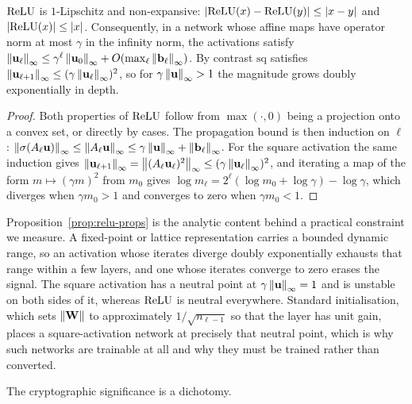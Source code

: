 \begin{proposition}
\label{prop:relu-props}
$\mathrm{ReLU}$ is $1$-Lipschitz and non-expansive: $\left\lvert \mathrm{ReLU}(x)-\mathrm{ReLU}(y) \right\rvert \le
\left\lvert x-y \right\rvert$ and $\left\lvert \mathrm{ReLU}(x) \right\rvert \le \left\lvert x \right\rvert$. Consequently, in a network whose
affine maps have operator norm at most $\gamma$ in the infinity norm, the
activations satisfy $\left\lVert \mathbf{u}_\ell \right\rVert_\infty \le \gamma^{\ell}
\left\lVert \mathbf{u}_0 \right\rVert_\infty + O(\max_\ell \left\lVert \mathbf{b}_\ell \right\rVert_\infty)$. By
contrast $\mathrm{sq}$ satisfies $\left\lVert \mathbf{u}_{\ell+1} \right\rVert_\infty \le
(\gamma\left\lVert \mathbf{u}_\ell \right\rVert_\infty)^2$, so for $\gamma\left\lVert \mathbf{u} \right\rVert_\infty >
1$ the magnitude grows doubly exponentially in depth.
\end{proposition}

\begin{proof}
Both properties of $\mathrm{ReLU}$ follow from $\max(\cdot,0)$ being a projection onto a
convex set, or directly by cases. The propagation bound is then induction on
$\ell$: $\left\lVert \sigma(A_\ell \mathbf{u}) \right\rVert_\infty \le \left\lVert A_\ell
\mathbf{u} \right\rVert_\infty \le \gamma \left\lVert \mathbf{u} \right\rVert_\infty +
\left\lVert \mathbf{b}_\ell \right\rVert_\infty$. For the square activation the same induction gives
$\left\lVert \mathbf{u}_{\ell+1} \right\rVert_\infty = \left\lVert (A_\ell\mathbf{u}_\ell)^2 \right\rVert_\infty \le
(\gamma\left\lVert \mathbf{u}_\ell \right\rVert_\infty)^2$, and iterating a map of the form
$m \mapsto (\gamma m)^2$ from $m_0$ gives $\log m_\ell = 2^{\ell}(\log m_0 + \log
\gamma) - \log\gamma$, which diverges when $\gamma m_0 > 1$ and converges to zero
when $\gamma m_0 < 1$.
\end{proof}

Proposition~\ref{prop:relu-props} is the analytic content behind a practical
constraint we measure. A fixed-point or lattice representation carries a bounded
dynamic range, so an activation whose iterates diverge doubly exponentially
exhausts that range within a few layers, and one whose iterates converge to zero
erases the signal. The square activation has a neutral point at
$\gamma\left\lVert \mathbf{u} \right\rVert_\infty = 1$ and is unstable on both sides of it, whereas
$\mathrm{ReLU}$ is neutral everywhere. Standard initialisation, which sets
$\left\lVert \mathbf{W} \right\rVert$ to approximately $1/\sqrt{n_{\ell-1}}$ so that the layer has
unit gain, places a square-activation network at precisely that neutral point,
which is why such networks are trainable at all and why they must be trained
rather than converted.

The cryptographic significance is a dichotomy.

